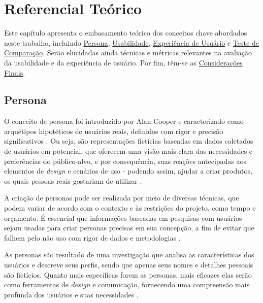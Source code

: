 \chapter[Referencial Teórico]{Referencial Teórico}

Este capítulo apresenta o embasamento teórico dos conceitos chave abordados
neste trabalho, incluindo \hyperref[sec:Persona]{Persona}, \hyperref[sec:Usabilidade]
{Usabilidade}, \hyperref[sec:Experiência de Usuário]{Experiência de Usuário} e 
\hyperref[sec:Teste de Comparação]{Teste de Comparação}. 
Serão elucidadas ainda técnicas e métricas relevantes na avaliação da usabilidade e 
da experiência de usuário. Por fim, têm-se as \hyperref[sec:Considerações Finais]{Considerações Finais}.

\section{Persona}
\label{sec:Persona}

O conceito de persona foi introduzido por Alan Cooper e caracterizado como 
arquétipos hipotéticos de usuários reais, definidos com rigor e precisão 
significativos \cite{cooper1999}. Ou seja, são representações fictícias 
baseadas em dados coletados de usuários em potencial, que oferecem uma visão 
mais clara das necessidades e preferências do público-alvo, e por consequência, 
suas reações antecipadas aos elementos de \textit{design} e cenários de uso - podendo 
assim, ajudar a criar produtos, os quais pessoas reais gostariam de utilizar 
\cite{pruitt2006}.

A criação de personas pode ser realizada por meio de diversas técnicas, que 
podem variar de acordo com o contexto e às restrições do projeto, como tempo e 
orçamento. É essencial que informações baseadas em pesquisas com usuários sejam 
usadas para criar personas precisas em sua concepção, a fim de evitar que falhem 
pelo não uso com rigor de dados e metodologias \cite{pruitt2006}.

As personas são resultado de uma investigação que analisa as características dos 
usuários e descreve seus perfis, sendo que apenas seus nomes e detalhes pessoais 
são fictícios. Quanto mais específicas forem as personas, mais eficazes elas serão 
como ferramentas de \textit{design} e comunicação, fornecendo uma compreensão mais profunda 
dos usuários e suas necessidades \cite{barbosa2010}.

